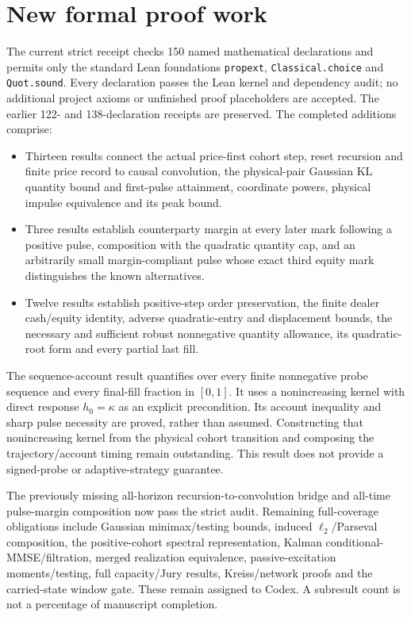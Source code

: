 \documentclass[11pt]{article}
\begin{document}
\section{New formal proof work}
The current strict receipt checks 150 named mathematical declarations and permits only the standard Lean foundations \texttt{propext}, \texttt{Classical.choice} and \texttt{Quot.sound}. Every declaration passes the Lean kernel and dependency audit; no additional project axioms or unfinished proof placeholders are accepted. The earlier 122- and 138-declaration receipts are preserved. The completed additions comprise:
\begin{itemize}
\item Thirteen results connect the actual price-first cohort step, reset recursion and finite price record to causal convolution, the physical-pair Gaussian KL quantity bound and first-pulse attainment, coordinate powers, physical impulse equivalence and its peak bound.
\item Three results establish counterparty margin at every later mark following a positive pulse, composition with the quadratic quantity cap, and an arbitrarily small margin-compliant pulse whose exact third equity mark distinguishes the known alternatives.
\item Twelve results establish positive-step order preservation, the finite dealer cash/equity identity, adverse quadratic-entry and displacement bounds, the necessary and sufficient robust nonnegative quantity allowance, its quadratic-root form and every partial last fill.
\end{itemize}

The sequence-account result quantifies over every finite nonnegative probe sequence and every final-fill fraction in $[0,1]$. It uses a nonincreasing kernel with direct response $h_0=\kappa$ as an explicit precondition. Its account inequality and sharp pulse necessity are proved, rather than assumed. Constructing that nonincreasing kernel from the physical cohort transition and composing the trajectory/account timing remain outstanding. This result does not provide a signed-probe or adaptive-strategy guarantee.

The previously missing all-horizon recursion-to-convolution bridge and all-time pulse-margin composition now pass the strict audit. Remaining full-coverage obligations include Gaussian minimax/testing bounds, induced $\ell_2$/Parseval composition, the positive-cohort spectral representation, Kalman conditional-MMSE/filtration, merged realization equivalence, passive-excitation moments/testing, full capacity/Jury results, Kreiss/network proofs and the carried-state window gate. These remain assigned to Codex. A subresult count is not a percentage of manuscript completion.
\end{document}
